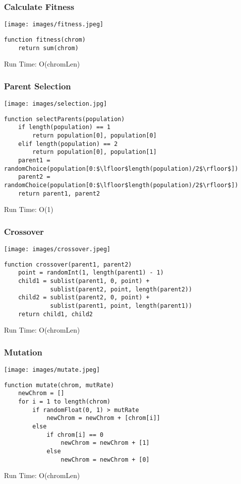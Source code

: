\documentclass{beamer}
\begin{document}
\begin{frame}[fragile]
\frametitle{Calculate Fitness}
\centering
\texttt{[image: images/fitness.jpeg]}
\begin{verbatim}
function fitness(chrom)
    return sum(chrom)
\end{verbatim}
Run Time: O(chromLen)
\end{frame}

\begin{frame}[fragile]
\frametitle{Parent Selection}
\centering
\texttt{[image: images/selection.jpg]}
\small

\begin{lstlisting}[mathescape=true, basicstyle=\ttfamily, frame=none]
function selectParents(population)
    if length(population) == 1
        return population[0], population[0]
    elif length(population) == 2
        return population[0], population[1]
    parent1 = randomChoice(population[0:$\lfloor$length(population)/2$\rfloor$])
    parent2 = randomChoice(population[0:$\lfloor$length(population)/2$\rfloor$])
    return parent1, parent2
\end{lstlisting}
Run Time: O(1)
\end{frame}

\begin{frame}[fragile]
\frametitle{Crossover}
\centering
\texttt{[image: images/crossover.jpeg]}
\begin{verbatim}
function crossover(parent1, parent2)
    point = randomInt(1, length(parent1) - 1)
    child1 = sublist(parent1, 0, point) + 
             sublist(parent2, point, length(parent2))
    child2 = sublist(parent2, 0, point) + 
             sublist(parent1, point, length(parent1))
    return child1, child2
\end{verbatim}
Run Time: O(chromLen)
\end{frame}

\begin{frame}[fragile]
\frametitle{Mutation}
\centering
\texttt{[image: images/mutate.jpeg]}
\small
\begin{verbatim}
function mutate(chrom, mutRate)
    newChrom = []
    for i = 1 to length(chrom)
        if randomFloat(0, 1) > mutRate
            newChrom = newChrom + [chrom[i]]
        else
            if chrom[i] == 0
                newChrom = newChrom + [1]
            else
                newChrom = newChrom + [0]
\end{verbatim}
Run Time: O(chromLen)
\end{frame}
\end{document}
